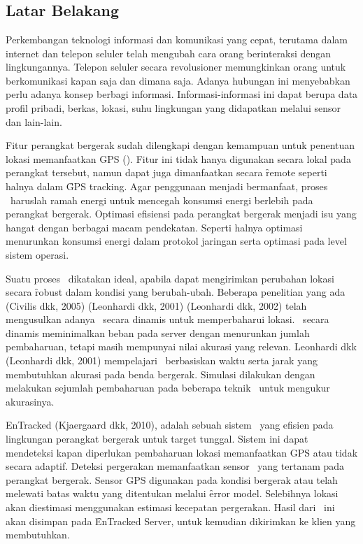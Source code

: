\chapter{\babSatu}
\section{Latar Belakang}

Perkembangan teknologi informasi dan komunikasi yang cepat, terutama dalam
internet dan telepon seluler telah mengubah cara orang berinteraksi dengan
lingkungannya.  Telepon seluler secara revolusioner memungkinkan orang untuk
berkomunikasi kapan saja dan dimana saja. Adanya hubungan ini menyebabkan perlu
adanya konsep berbagi informasi.  Informasi-informasi ini dapat berupa data
profil pribadi, berkas, lokasi, suhu lingkungan yang didapatkan melalui sensor
dan lain-lain.

Fitur perangkat bergerak sudah dilengkapi dengan kemampuan untuk penentuan
lokasi memanfaatkan GPS (\GPS).  Fitur ini tidak hanya digunakan secara lokal
pada perangkat tersebut, namun dapat juga dimanfaatkan secara \f{remote}
seperti halnya dalam \f{GPS tracking}. Agar penggunaan menjadi bermanfaat,
proses \tracking~haruslah ramah energi untuk mencegah konsumsi energi berlebih
pada perangkat bergerak. Optimasi efisiensi pada perangkat bergerak menjadi isu
yang hangat dengan berbagai macam pendekatan. Seperti halnya optimasi
menurunkan konsumsi energi dalam protokol jaringan serta optimasi pada level
sistem operasi. 

Suatu proses \tracking~dikatakan ideal, apabila dapat mengirimkan perubahan
lokasi secara \f{robust} dalam kondisi yang berubah-ubah. Beberapa penelitian
yang ada (Civilis dkk, 2005) (Leonhardi dkk, 2001) (Leonhardi dkk, 2002) telah
mengusulkan adanya \tracking~secara dinamis untuk memperbaharui lokasi.
\tracking~secara dinamis meminimalkan beban pada server dengan menurunkan
jumlah pembaharuan, tetapi masih mempunyai nilai akurasi yang relevan.
Leonhardi dkk (Leonhardi dkk, 2001) mempelajari \tracking~berbasiskan waktu
serta jarak yang membutuhkan akurasi pada benda bergerak. Simulasi dilakukan
dengan melakukan sejumlah pembaharuan pada beberapa teknik \tracking~untuk
mengukur akurasinya. 

EnTracked (Kjaergaard dkk, 2010), adalah sebuah sistem \tracking~yang efisien
pada lingkungan perangkat bergerak untuk target tunggal. Sistem ini dapat
mendeteksi kapan diperlukan pembaharuan lokasi memanfaatkan GPS atau tidak
secara adaptif. Deteksi pergerakan memanfaatkan sensor \acc~yang tertanam pada
perangkat bergerak. Sensor GPS digunakan pada kondisi bergerak atau telah
melewati batas waktu yang ditentukan melalui \f{error model}. Selebihnya lokasi
akan diestimasi menggunakan estimasi kecepatan pergerakan. Hasil dari
\tracking~ini akan disimpan pada \f{EnTracked Server}, untuk kemudian
dikirimkan ke klien yang membutuhkan.


